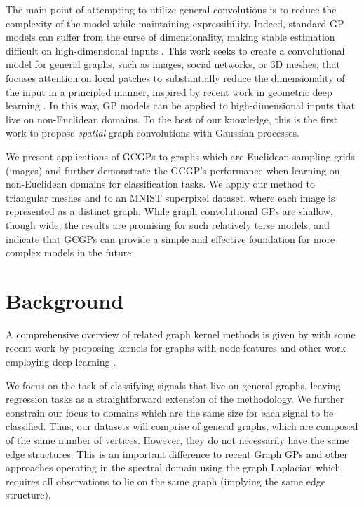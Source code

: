 \documentclass{article}
\begin{document}
The main point of attempting to utilize general convolutions is to reduce the complexity of the model while maintaining expressibility. Indeed, standard GP models can suffer from the curse of dimensionality, making stable estimation difficult on high-dimensional inputs \citep{rasmussen2004gaussian}. This work seeks to create a convolutional model for general graphs, such as images, social networks, or 3D meshes, that focuses attention on local patches to substantially reduce the dimensionality of the input in a principled manner, inspired by recent work in geometric deep learning \citep{gdl}. In this way, GP models can be applied to high-dimensional inputs that live on non-Euclidean domains. To the best of our knowledge, this is the first work to propose \emph{spatial} graph convolutions with Gaussian processes.

We present applications of GCGPs to graphs which are Euclidean sampling grids (images) and further demonstrate the GCGP's performance when learning on non-Euclidean domains for classification tasks. We apply our method to triangular meshes and to an MNIST superpixel dataset, where each image is represented as a distinct graph.
While graph convolutional GPs are shallow, though wide, the results are promising for such relatively terse models, and indicate that GCGPs can provide a simple and effective foundation for more complex models in the future.

\section{Background}
A comprehensive overview of related graph kernel methods is given by \citet{vishwanathan2010graph} with some recent work by \citet{neumann2016propagation} proposing kernels for graphs with node features and other work employing deep learning \citep{zhang2018end,duvenaud2015convolutional}.

We focus on the task of classifying signals that live on general graphs, leaving regression tasks as a straightforward extension of the methodology. We further constrain our focus to domains which are the same size for each signal to be classified. Thus, our datasets will comprise of general graphs, which are composed of the same number of vertices. However, they do not necessarily have the same edge structures. This is an important difference to recent Graph GPs \citep{ng2018bayesian} and other approaches \citep{venkitaraman2018gaussian} operating in the spectral domain using the graph Laplacian which requires all observations to lie on the same graph (implying the same edge structure).
\end{document}
